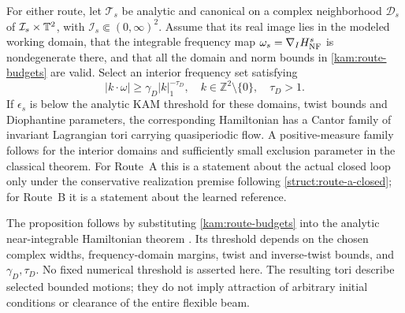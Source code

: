 \begin{proposition}
\label{kam:flow-theorem}
For either route, let $\mathcal T_s$ be analytic and canonical on a complex neighborhood $\mathcal D_s$ of $\mathcal I_s\times\mathbb T^2$, with $\mathcal I_s\Subset(0,\infty)^2$. Assume that its real image lies in the modeled working domain, that the integrable frequency map $\omega_s=\nabla_IH_{\rm NF}^s$ is nondegenerate there, and that all the domain and norm bounds in \eqref{kam:route-budgets} are valid. Select an interior frequency set satisfying
\begin{equation}\label{kam:flow-divisors}
 |k\cdot\omega|\ge\gamma_D|k|_1^{-\tau_D},
 \quad k\in\mathbb Z^2\setminus\{0\},\quad\tau_D>1.
\end{equation}
If $\epsilon_s$ is below the analytic KAM threshold for these domains, twist bounds and Diophantine parameters, the corresponding Hamiltonian has a Cantor family of invariant Lagrangian tori carrying quasiperiodic flow. A positive-measure family follows for the interior domains and sufficiently small exclusion parameter in the classical theorem. For Route~A this is a statement about the actual closed loop only under the conservative realization premise following \eqref{struct:route-a-closed}; for Route~B it is a statement about the learned reference.
\end{proposition}

The proposition follows by substituting \eqref{kam:route-budgets} into the analytic near-integrable Hamiltonian theorem \citep{poschel}. Its threshold depends on the chosen complex widths, frequency-domain margins, twist and inverse-twist bounds, and $\gamma_D,\tau_D$. No fixed numerical threshold is asserted here. The resulting tori describe selected bounded motions; they do not imply attraction of arbitrary initial conditions or clearance of the entire flexible beam.

